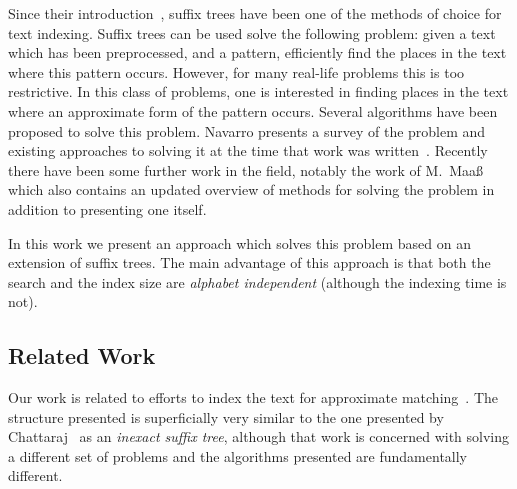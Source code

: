 Since their introduction~\cite{DBLP:conf/focs/Weiner73}, suffix trees have been one of the methods of choice for text indexing. Suffix trees can be used solve the following problem: given a text which has been preprocessed, and a pattern, efficiently find the places in the text where this pattern occurs.  However, for many real-life problems this is too restrictive. In this class of problems, one is interested in finding places in the text where an approximate form of the pattern occurs. Several algorithms have been proposed to solve this problem. Navarro presents a survey of the problem and existing approaches to solving it at the time that work was written~\cite{navarro:guided}. Recently there have been some further work in the field, notably the work of M.~Maa\ss{}~\cite{maass:text} which also contains an updated overview of methods for solving the problem in addition to presenting one itself.

In this work we present an approach which solves this problem based on an extension of suffix trees. The main advantage of this approach is that both the search and the index size are \emph{alphabet independent} (although the indexing time is not).

\subsection{Related Work}

Our work is related to efforts to index the text for approximate matching~\cite{maass:text,amir00oneerror}. The structure presented is superficially very similar to the one presented by Chattaraj~\cite{DBLP:journals/tcs/ChattarajP05} as an \textit{inexact suffix tree}, although that work is concerned with solving a different set of problems and the algorithms presented are fundamentally different.
